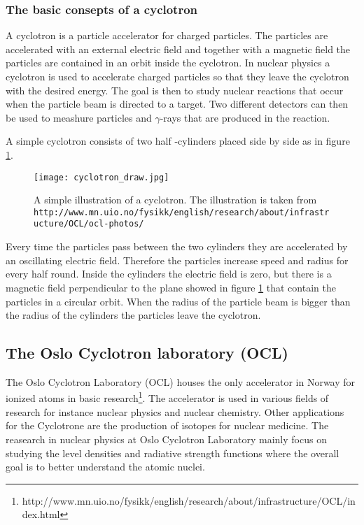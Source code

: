 \documentclass[11pt,a4wide]{article}
\begin{document}
\subsubsection*{The basic consepts of a cyclotron}
A cyclotron is a particle accelerator for charged particles. The particles are accelerated with an external electric field and together with a magnetic field the particles are contained in an orbit inside the cyclotron. In nuclear physics a cyclotron is used to accelerate charged particles so that they leave the cyclotron with the desired energy. The goal is then to study nuclear reactions that occur when the particle beam is directed to a target. Two different detectors can then be used to meashure particles and $\gamma$-rays that are produced in the reaction. 

A simple cyclotron consists of two half -cylinders placed side by side as in figure \ref{fig:cyclotron_draw}.
\begin{figure}[htp]
\centering
\texttt{[image: cyclotron\_draw.jpg]}
\caption{A simple illustration of a cyclotron. The illustration is taken from \texttt{http://www.mn.uio.no/fysikk/english/research/about/infrastructure/OCL/ocl-photos/}}
\label{fig:cyclotron_draw}
\end{figure}
Every time the particles pass between the two cylinders they are accelerated by an oscillating electric field. Therefore the particles increase speed and radius for every half round. Inside the cylinders the electric field is zero, but there is a magnetic field perpendicular to the plane showed in figure \ref{fig:cyclotron_draw} that contain the particles in a circular orbit. When the radius of the particle beam is bigger than the radius of the cylinders the particles leave the cyclotron. 

\subsection{The Oslo Cyclotron laboratory (OCL)}
The Oslo Cyclotron Laboratory (OCL) houses the only accelerator in Norway for ionized atoms in basic research\footnote{http://www.mn.uio.no/fysikk/english/research/about/infrastructure/OCL/index.html}. The accelerator is used in various fields of research for instance nuclear physics and nuclear chemistry. Other applications for the Cyclotrone are the production of isotopes for nuclear medicine. The reasearch in nuclear physics at Oslo Cyclotron Laboratory mainly focus on studying the level densities and radiative strength functions where the overall goal is to better understand the atomic nuclei. 
\end{document}
